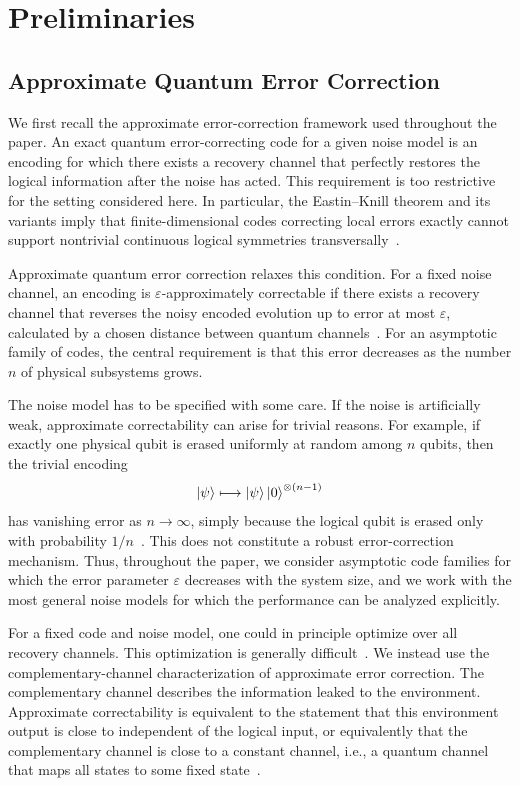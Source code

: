 \documentclass[10pt,twocolumn,superscriptaddress,aps,amsmath,amssymb,citeautoscript,floatfix,prx]{revtex4-2}
\theoremstyle{plain}
\theoremstyle{plain}
\theoremstyle{plain}
\theoremstyle{plain}
\theoremstyle{plain}
\theoremstyle{plain}
\theoremstyle{plain}
\theoremstyle{definition}
\theoremstyle{plain}
\begin{document}
\section{Preliminaries}\label{sec:main_prelim}

\subsection{Approximate Quantum Error Correction}\label{subsec:main_AQEC}

We first recall the approximate error-correction framework used throughout the paper. 
An exact quantum error-correcting code for a given noise model is an encoding for which there exists a recovery 
channel that perfectly restores the logical information after the noise has acted. This requirement is too restrictive 
for the setting considered here. In particular, the Eastin--Knill theorem and its variants imply that finite-dimensional codes 
correcting local errors exactly cannot support nontrivial continuous logical symmetries transversally~\cite{Eastin2009}.

Approximate quantum error correction relaxes this condition. For a fixed noise channel, 
an encoding is $\varepsilon$-approximately correctable if there exists a recovery channel that reverses the noisy encoded evolution 
up to error at most $\varepsilon$, calculated by a chosen distance between quantum channels~\cite{Beny2010}. 
For an asymptotic family of codes, the central requirement is that this error decreases as the number $n$ of physical subsystems grows.

The noise model has to be specified with some care. If the noise is artificially weak, approximate correctability can arise for trivial reasons.
 For example, if exactly one physical qubit is erased uniformly at random among $n$ qubits, then the trivial encoding
$$
\ket\psi
\longmapsto
\ket\psi\ket 0^{\otimes(n-1)}
$$
has vanishing error as $n\to\infty$, simply because the logical qubit is erased only with probability $1/n$~\cite{Yi2024}. 
This does not constitute a robust error-correction mechanism. Thus, throughout the paper, we consider asymptotic code families 
for which the error parameter $\varepsilon$ decreases with the system size, and we work with the most general noise models for which 
the performance can be analyzed explicitly.

For a fixed code and noise model, one could in principle optimize over all recovery channels. 
This optimization is generally difficult~\cite{PhysRevA.75.012338}. We instead use the complementary-channel 
characterization of approximate error correction. The complementary channel describes the information leaked to the environment. 
Approximate correctability is equivalent to the statement that this environment output is close to independent of the logical input, 
or equivalently that the complementary channel is close to a constant channel, i.e., a quantum channel that maps all states to some fixed 
state~\cite{Beny2010, Faist2020}.
\end{document}
